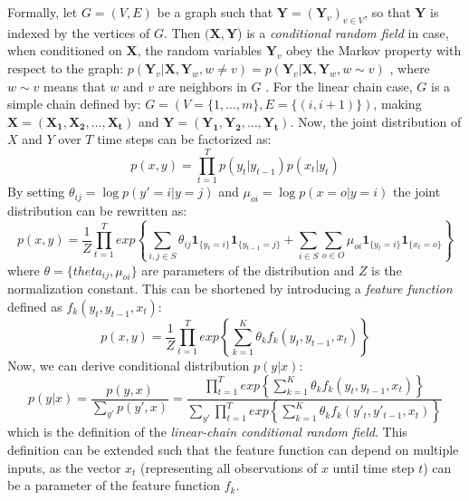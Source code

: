 Formally, let $G = (V, E)$ be a graph such that $\mathbf{Y} = (\mathbf{Y}_v)_{v
\in V}$, so that $\mathbf{Y}$ is indexed by the vertices of $G$. Then
$(\mathbf{X}, \mathbf{Y}$) is a \textit{conditional random field} in case, when
conditioned on $\mathbf{X}$, the random variables $\mathbf{Y}_v$ obey the
Markov property with respect to the graph: $p(\mathbf{Y}_v | \mathbf{X},
\mathbf{Y}_w, w \neq v) = p(\mathbf{Y}_v | \mathbf{X}, \mathbf{Y}_w, w \sim v)$
, where $w \sim v$ means that $w$ and $v$ are neighbors in $G$
\citep{lafferty2001conditional}. 
For the linear chain case, $G$ is a simple chain
defined by: $G = (V = \{1, \dots, m\}, E = \{(i, i + 1)\})$, making 
$\mathbf{X} = (\mathbf{X_1}, \mathbf{X_2}, \dots, \mathbf{X_t})$
and $\mathbf{Y} = (\mathbf{Y_1}, \mathbf{Y_2}, \dots, \mathbf{Y_t})$.
Now, the joint distribution of $X$ and $Y$ over $T$ time steps 
can be factorized as:
$$
p(x, y) = \prod_{t=1}^{T} p(y_t | y_{t - 1}) p(x_t | y_t)
$$
By setting $\theta_{ij} = \log p(y' = i | y = j)$ and
$\mu_{oi} = \log p(x = o | y = i)$ the joint distribution
can be rewritten as:
$$
p(x, y) = \frac{1}{Z} \prod_{t=1}^{T} exp \left\{ \sum_{i, j \in S} \theta_{ij} \mathbf{1}_{\{y_t=i\}} \mathbf{1}_{\{y_{t-1} = j\}}
+ \sum_{i \in S} \sum_{o \in O} \mu_{oi} \mathbf{1}_{\{y_t = i\}}\mathbf{1}_{\{x_t  = o\}} \right\}
$$
where $\theta = \{theta_{ij}, \mu_{oi}\}$ are parameters of the distribution and $Z$ is the
normalization constant. This can be shortened by 
introducing a \textit{feature function}
defined as $f_k (y_t, y_{t - 1}, x_t)$:
$$
p(x, y) = \frac{1}{Z} \prod_{t=1}^{T} exp \left\{ \sum_{k=1}^{K} \theta_k f_k(y_t, y_{t - 1}, x_t) \right\}
$$
Now, we can derive conditional distribution $p(y | x)$:
\begin{equation}\label{eq:cond_crf}
p(y | x) = \frac{p(y, x)}{\sum_{y'} p(y', x)}  = 
\frac{\prod_{t=1}^{T} exp \left\{ \sum_{k=1}^{K} \theta_k f_k(y_t, y_{t - 1}, x_t) \right\}}
{\sum_{y'} \prod_{t=1}^{T} exp \left\{ \sum_{k=1}^{K} \theta_k f_k(y'_t, y'_{t - 1}, x_t) \right\}}
\end{equation}
which is the definition of the \textit{linear-chain conditional random field}.
This definition can be extended such that the feature function can depend on 
multiple inputs, as the vector $x_t$ (representing all observations of $x$
until time step $t$) can be a parameter of the feature function $f_k$. 

